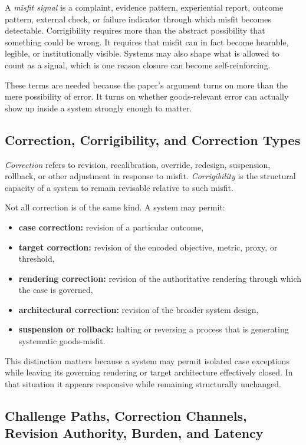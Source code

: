 \documentclass[11pt]{article}
\renewcommand{\emph}[1]{\textit{#1}}
\begin{document}
A \emph{misfit signal} is a complaint, evidence pattern, experiential report, outcome pattern, external check, or failure indicator through which misfit becomes detectable. Corrigibility requires more than the abstract possibility that something could be wrong. It requires that misfit can in fact become hearable, legible, or institutionally visible. Systems may also shape what is allowed to count as a signal, which is one reason closure can become self-reinforcing.

These terms are needed because the paper's argument turns on more than the mere possibility of error. It turns on whether goods-relevant error can actually show up inside a system strongly enough to matter.

\subsection{Correction, Corrigibility, and Correction Types}

\emph{Correction} refers to revision, recalibration, override, redesign, suspension, rollback, or other adjustment in response to misfit. \emph{Corrigibility} is the structural capacity of a system to remain revisable relative to such misfit.

Not all correction is of the same kind. A system may permit:
\begin{itemize}
    \item \textbf{case correction:} revision of a particular outcome,
    \item \textbf{target correction:} revision of the encoded objective, metric, proxy, or threshold,
    \item \textbf{rendering correction:} revision of the authoritative rendering through which the case is governed,
    \item \textbf{architectural correction:} revision of the broader system design,
    \item \textbf{suspension or rollback:} halting or reversing a process that is generating systematic goods-misfit.
\end{itemize}

This distinction matters because a system may permit isolated case exceptions while leaving its governing rendering or target architecture effectively closed. In that situation it appears responsive while remaining structurally unchanged.

\subsection{Challenge Paths, Correction Channels, Revision Authority, Burden, and Latency}
\end{document}
